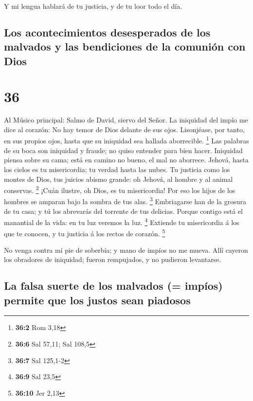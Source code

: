  Y mi lengua hablará de tu justicia, y de tu loor todo el
día.

\hypertarget{los-acontecimientos-desesperados-de-los-malvados-y-las-bendiciones-de-la-comuniuxf3n-con-dios}{%
\subsection{Los acontecimientos desesperados de los malvados y las
bendiciones de la comunión con
Dios}\label{los-acontecimientos-desesperados-de-los-malvados-y-las-bendiciones-de-la-comuniuxf3n-con-dios}}

\hypertarget{section-35}{%
\section{36}\label{section-35}}

 Al Músico principal: Salmo de David, siervo del Señor. La
iniquidad del impío me dice al corazón: No hay temor de Dios delante de
sus ojos.  Lisonjéase, por tanto, en sus propios ojos, hasta
que su iniquidad sea hallada aborrecible. \footnote{\textbf{36:2} Rom
  3,18}  Las palabras de su boca son iniquidad y fraude; no
quiso entender para bien hacer.  Iniquidad piensa sobre su
cama; está en camino no bueno, el mal no aborrece.  Jehová,
hasta los cielos es tu misericordia; tu verdad hasta las nubes.
 Tu justicia como los montes de Dios, tus juicios abismo
grande: oh Jehová, al hombre y al animal conservas. \footnote{\textbf{36:6}
  Sal 57,11; Sal 108,5}  ¡Cuán ilustre, oh Dios, es tu
misericordia! Por eso los hijos de los hombres se amparan bajo la sombra
de tus alas. \footnote{\textbf{36:7} Sal 125,1-2} 
Embriagarse han de la grosura de tu casa; y tú los abrevarás del
torrente de tus delicias.  Porque contigo está el manantial
de la vida: en tu luz veremos la luz. \footnote{\textbf{36:9} Sal 23,5}
 Extiende tu misericordia á los que te conocen, y tu
justicia á los rectos de corazón. \footnote{\textbf{36:10} Jer 2,13}

 No venga contra mí pie de soberbia; y mano de impíos no me
mueva.  Allí cayeron los obradores de iniquidad; fueron
rempujados, y no pudieron levantarse.

\hypertarget{la-falsa-suerte-de-los-malvados-impuxedos-permite-que-los-justos-sean-piadosos}{%
\subsection{La falsa suerte de los malvados (= impíos) permite que los
justos sean
piadosos}\label{la-falsa-suerte-de-los-malvados-impuxedos-permite-que-los-justos-sean-piadosos}}

